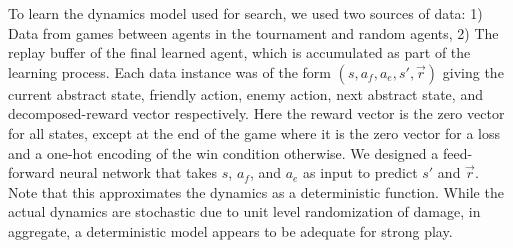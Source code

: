 \documentclass{article}
\begin{document}









To learn the dynamics model used for search, we used two sources of data: 1) Data from games between agents in the tournament and random agents, 2) The replay buffer of the final learned agent, which is accumulated as part of the learning process. Each data instance was of the form $(s, a_f, a_e, s', \vec{r})$ giving the current abstract state, friendly action, enemy action, next abstract state, and decomposed-reward vector respectively. Here the reward vector is the zero vector for all states, except at the end of the game where it is the zero vector for a loss and a one-hot encoding of the win condition otherwise. We designed a feed-forward neural network that takes $s$, $a_f$, and $a_e$ as input to predict $s'$ and $\vec{r}$. Note that this approximates the dynamics as a deterministic function. While the actual dynamics are stochastic due to unit level randomization of damage, in aggregate, a deterministic model appears to be adequate for strong play. 
\end{document}
